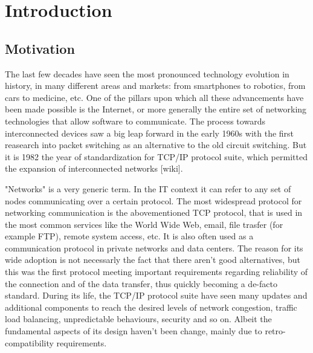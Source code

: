 \chapter{Introduction}
\label{chap:introduction}

\section{Motivation}
The last few decades have seen the most pronounced technology evolution in history, in many different areas and markets: from smartphones to robotics, from cars to medicine, etc. One of the pillars upon which all these advancements have been made possible is the Internet, or more generally the entire set of networking technologies that allow software to communicate. The process towards interconnected devices saw a big leap forward in the early 1960s with the first reasearch into packet switching as an alternative to the old circuit switching. But it is 1982 the year of standardization for TCP/IP protocol suite, which permitted the expansion of interconnected networks  [wiki]. 


"Networks" is a very generic term. In the IT context it can refer to any set of nodes communicating over a certain protocol. The most widespread protocol for networking communication is the abovementioned TCP protocol, that is used in the most common services like the World Wide Web, email, file trasfer (for example FTP), remote system access, etc. It is also often used as a communication protocol in private networks and data centers. The reason for its wide adoption is not necessarly the fact that there aren't good alternatives, but this was the first protocol meeting important requirements regarding reliability of the connection and of the data transfer, thus quickly becoming a de-facto standard. During its life, the TCP/IP protocol suite have seen many updates and additional components to reach the desired levels of network congestion, traffic load balancing, unpredictable behaviours, security and so on. Albeit the fundamental aspects of its design haven't been change, mainly due to retro-compatibility requirements.


